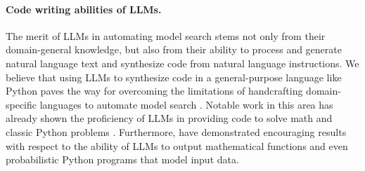 \paragraph{Code writing abilities of LLMs.}
The merit of LLMs in automating model search stems not only from their domain-general knowledge, but also from their ability to process and generate natural language text and synthesize code from natural language instructions. We believe that using LLMs to synthesize code in a general-purpose language like Python paves the way for overcoming the limitations of handcrafting domain-specific languages to automate model search \cite{austin2021program,ni2024l2ceval}.
Notable work in this area has already shown the proficiency of LLMs in providing code to solve math and classic Python problems \cite{austin2021program, ni2024l2ceval, perez2021automatic}. Furthermore, \cite{li2024automated, xiao2024verbalized, zheng2023large} have demonstrated encouraging results with respect to the ability of LLMs to output mathematical functions and even probabilistic Python programs that model input data.